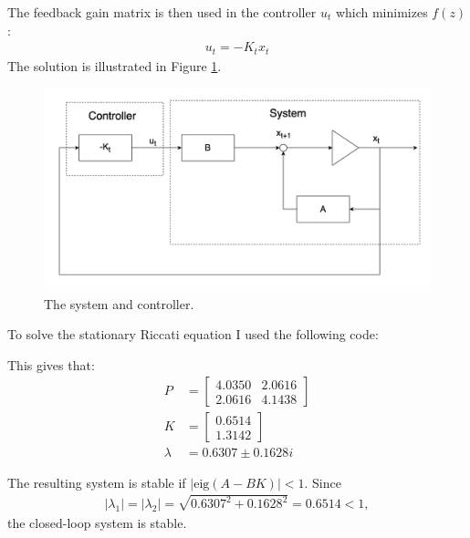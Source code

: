 \documentclass[11pt, a4paper, english]{NTNUoving}
\begin{document}
\begin{oppgave}
\begin{punkt}
        The feedback gain matrix is then used in the controller $u_t$ which minimizes $f(z)$:
        \begin{align*}
            u_t = -K_t x_t
        \end{align*}
        The solution is illustrated in Figure \ref{fig:1c}.
         \begin{figure}[H]
             \centering
             \includegraphics[width=1.0\textwidth]{../1c.png}
             \caption{The system and controller.}
             \label{fig:1c}
         \end{figure}
    \end{punkt}

    \begin{punkt}
        To solve the stationary Riccati equation I used the following code:
        

        This gives that:
        \begin{align*}
            P &= \begin{bmatrix}
                4.0350 & 2.0616 \\
                2.0616 & 4.1438
            \end{bmatrix} \\
            K &= \begin{bmatrix}
                0.6514 \\ 1.3142
            \end{bmatrix} \\
            \lambda &= 0.6307 \pm 0.1628i
        \end{align*}

        The resulting system is stable if $|\text{eig}(A-BK)| < 1$. Since
        \begin{align*}
            |\lambda_1| = |\lambda_2| = \sqrt{0.6307^2 + 0.1628^2} = 0.6514 < 1,
        \end{align*}
        the closed-loop system is stable.
        \end{punkt}


\end{oppgave}
\end{document}
